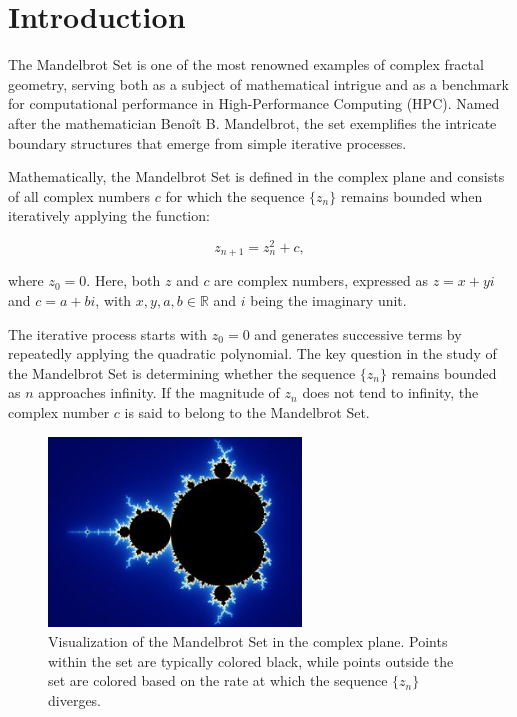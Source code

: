 \documentclass[
	report, %
	11pt, %
]{CSUniSchoolLabReport}
\newcounter{ct}
\begin{document}
\tableofcontents %
\thispagestyle{empty}
\pagebreak

\section{Introduction}

The Mandelbrot Set is one of the most renowned examples of complex fractal geometry, serving both as a subject of mathematical intrigue and as a benchmark for computational performance in High-Performance Computing (HPC). Named after the mathematician Benoît B. Mandelbrot, the set exemplifies the intricate boundary structures that emerge from simple iterative processes.

Mathematically, the Mandelbrot Set is defined in the complex plane and consists of all complex numbers \( c \) for which the sequence \( \{ z_n \} \) remains bounded when iteratively applying the function:

\begin{equation}
	z_{n+1} = z_n^2 + c,
\end{equation}

where \( z_0 = 0 \). Here, both \( z \) and \( c \) are complex numbers, expressed as \( z = x + yi \) and \( c = a + bi \), with \( x, y, a, b \in \mathbb{R} \) and \( i \) being the imaginary unit.

The iterative process starts with \( z_0 = 0 \) and generates successive terms by repeatedly applying the quadratic polynomial. The key question in the study of the Mandelbrot Set is determining whether the sequence \( \{ z_n \} \) remains bounded as \( n \) approaches infinity. If the magnitude of \( z_n \) does not tend to infinity, the complex number \( c \) is said to belong to the Mandelbrot Set.

\begin{figure}[h]
	\centering
	\captionsetup{justification=centering, width=.8\linewidth}
	\includegraphics[width=0.6\textwidth]{./img/mandelbrot-set-google.jpg}
	\caption{Visualization of the Mandelbrot Set in the complex plane. Points within the set are typically colored black, while points outside the set are colored based on the rate at which the sequence \( \{ z_n \} \) diverges.}
	\label{fig:mandelbrot}
\end{figure}
\end{document}
